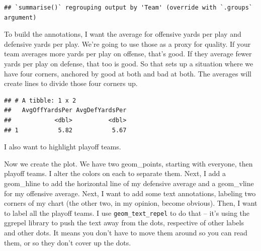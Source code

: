 \documentclass[
]{book}
\newenvironment{Shaded}{\begin{snugshade}}{\end{snugshade}}
\newcommand{\DataTypeTok}[1]{\textcolor[rgb]{0.13,0.29,0.53}{#1}}
\newcommand{\KeywordTok}[1]{\textcolor[rgb]{0.13,0.29,0.53}{\textbf{#1}}}
\newcommand{\NormalTok}[1]{#1}
\newcommand{\OperatorTok}[1]{\textcolor[rgb]{0.81,0.36,0.00}{\textbf{#1}}}
\newcommand{\StringTok}[1]{\textcolor[rgb]{0.31,0.60,0.02}{#1}}
\begin{document}
\begin{verbatim}
## `summarise()` regrouping output by 'Team' (override with `.groups` argument)
\end{verbatim}

To build the annotations, I want the average for offensive yards per play and defensive yards per play. We're going to use those as a proxy for quality. If your team averages more yards per play on offense, that's good. If they average fewer yards per play on defense, that too is good. So that sets up a situation where we have four corners, anchored by good at both and bad at both. The averages will create lines to divide those four corners up.

\begin{Shaded}
\end{Shaded}

\begin{verbatim}
## # A tibble: 1 x 2
##   AvgOffYardsPer AvgDefYardsPer
##            <dbl>          <dbl>
## 1           5.82           5.67
\end{verbatim}

I also want to highlight playoff teams.

\begin{Shaded}
\end{Shaded}

Now we create the plot. We have two geom\_points, starting with everyone, then playoff teams. I alter the colors on each to separate them. Next, I add a geom\_hline to add the horizontal line of my defensive average and a geom\_vline for my offensive average. Next, I want to add some text annotations, labeling two corners of my chart (the other two, in my opinion, become obvious). Then, I want to label all the playoff teams. I use \texttt{geom\_text\_repel} to do that -- it's using the ggrepel library to push the text away from the dots, respective of other labels and other dots. It means you don't have to move them around so you can read them, or so they don't cover up the dots.
\end{document}
